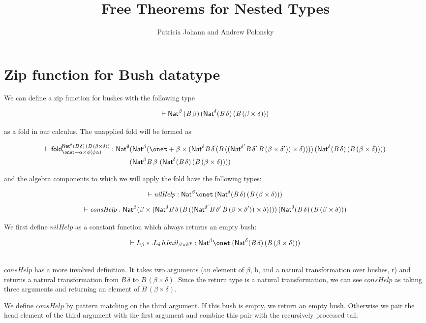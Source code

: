 \documentclass[acmsmall,review,anonymous]{acmart}
\title[Free Theorems for Nested Types]{Free Theorems for 
Nested Types} %
\author{Patricia Johann and Andrew Polonsky}
\affiliation{
  \institution{Appalachian State University}            %
}
\theoremstyle{definition}
\newcommand{\F}{\mathcal{F}}
\begin{document}
\newcommand{\BBush}{\mathit{B}\,}
\newcommand{\nilHelp}{\mathit{nilHelp}}
\newcommand{\consHelp}{\mathit{consHelp}}
\renewcommand{\F}[1]{\Nat^{#1} (\BBush #1)\, (\BBush (\beta \times #1))}
\section{Zip function for Bush datatype}

We can define a zip function for bushes with the following type

$$\vdash \Nat^\beta \, (\BBush \beta) \, (\Nat^\delta (\BBush \delta) \, 
(\BBush (\beta \times \delta)))$$

as a fold in our calculus. The unapplied fold will be formed as

\begin{align*}
\vdash \fold^{\F{\delta}}_{\onet + \alpha \times \phi(\phi\alpha)} : 
  \Nat^\emptyset &(\Nat^\beta (\onet + 
  \beta \times 
(\Nat^\delta \BBush \delta \, (\BBush ((\Nat^{\delta'} \BBush \delta'
\, \BBush (\beta \times \delta')) \times \delta ))
)
) \, (\F{\delta})) \\
  &(\Nat^\beta \BBush \beta \,\, (\F{\delta}))
\end{align*}

and the algebra components to which we will apply the fold have the 
following types:

$$\vdash \nilHelp : \Nat^\beta \onet \, (\F{\delta})$$
$$\vdash \consHelp : \Nat^\beta (\beta \times 
(\Nat^\delta \BBush \delta \, (\BBush ((\Nat^{\delta'} \BBush \delta'
\, \BBush (\beta \times \delta')) \times \delta ))))
\, (\F{\delta})$$

We first define $\nilHelp$ as a constant function which always returns an empty
bush:

$$\vdash L_\beta *. L_\delta \, b. bnil_{\beta\times\delta} * : 
\Nat^\beta \onet \, (\F{\delta})$$

\noindent \\
$\consHelp$ has a more involved definition. It takes two arguments (an element of
$\beta$, b,  and a natural transformation over bushes, r) and returns a natural transformation
from $\BBush \delta$ to $\BBush (\beta \times \delta)$. Since the return type is a natural
transformation, we can see $\consHelp$ as taking three arguments and returning
an element of $\BBush (\beta \times \delta)$. 

We define $\consHelp$ by pattern matching on the third argument. If this bush is empty,
we return an empty bush. Otherwise we pair the head element of the third argument
with the first argument and combine this pair with the recursively processed tail:
\end{document}
